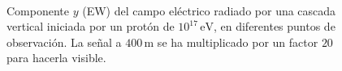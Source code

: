 \documentclass[12 pt, a4paper]{article} %
\numberwithin{equation}{section}
\numberwithin{figure}{section}
\begin{document}
\begin{figure}[H]
	\centering
	\\
	\caption{Componente $y$ (EW) del campo eléctrico radiado por una cascada vertical iniciada por un protón de $10^{17}\,\mathrm{eV}$, en diferentes puntos de observación. La señal a $400\,\mathrm{m}$ se ha multiplicado por un factor $20$ para hacerla visible.}
	\label{EW_field}
\end{figure}
\end{document}
